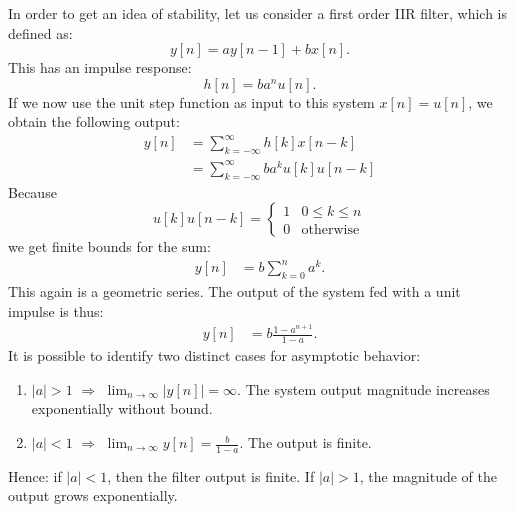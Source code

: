 In order to get an idea of stability, let us consider a first order IIR filter, which is defined as:
\begin{equation}
y[n] = a y[n-1] + b x[n].
\end{equation}
This has an impulse response:
\begin{equation}
h[n] = b a^n u[n].
\end{equation}
If we now use the unit step function as input to this system $x[n]=u[n]$, we obtain the following output:
\begin{align}
y[n] &= \sum_{k=-\infty}^{\infty} h[k]x[n-k]  \\
     &= \sum_{k=-\infty}^{\infty} b a^k u[k]u[n-k]
\end{align}
Because 
\begin{equation}
u[k]u[n-k] = \left\{\begin{array}{cc}
1 & 0 \le k \le n\\
0 & \mathrm{otherwise}
\end{array}
\right.
\end{equation}
we get finite bounds for the sum:
\begin{align}
y[n] &= b \sum_{k=0}^{n} a^k.
\end{align}
This again is a geometric series. The output of the system fed with a unit impulse is thus:
\begin{align}
y[n] &= b\frac{1-a^{n+1}}{1-a}.
\end{align}
It is possible to identify two distinct cases for asymptotic behavior:
\begin{enumerate}
\item $|a|>1$ $\Rightarrow$ $\lim_{n\rightarrow \infty} |y[n]| = \infty$. The system output magnitude increases exponentially without bound.
\item $|a|<1$ $\Rightarrow$ $\lim_{n\rightarrow \infty}y[n]=\frac{b}{1-a}$. The output is finite. 
\end{enumerate}
Hence: if $|a|<1$, then the filter output is finite. If $|a|>1$, the magnitude of the output grows exponentially. 
